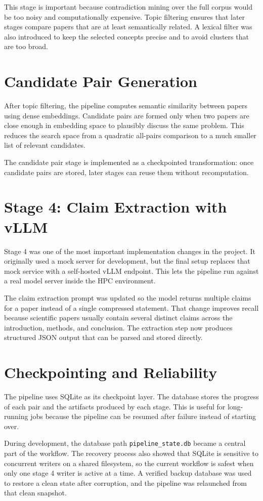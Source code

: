 \documentclass[11pt]{article}
\begin{document}
This stage is important because contradiction mining over the full corpus would be too noisy and computationally expensive. Topic filtering ensures that later stages compare papers that are at least semantically related. A lexical filter was also introduced to keep the selected concepts precise and to avoid clusters that are too broad.

\section{Candidate Pair Generation}
After topic filtering, the pipeline computes semantic similarity between papers using dense embeddings. Candidate pairs are formed only when two papers are close enough in embedding space to plausibly discuss the same problem. This reduces the search space from a quadratic all-pairs comparison to a much smaller list of relevant candidates.

The candidate pair stage is implemented as a checkpointed transformation: once candidate pairs are stored, later stages can reuse them without recomputation.

\section{Stage 4: Claim Extraction with vLLM}
Stage 4 was one of the most important implementation changes in the project. It originally used a mock server for development, but the final setup replaces that mock service with a self-hosted vLLM endpoint. This lets the pipeline run against a real model server inside the HPC environment.

The claim extraction prompt was updated so the model returns multiple claims for a paper instead of a single compressed statement. That change improves recall because scientific papers usually contain several distinct claims across the introduction, methods, and conclusion. The extraction step now produces structured JSON output that can be parsed and stored directly.

\section{Checkpointing and Reliability}
The pipeline uses SQLite as its checkpoint layer. The database stores the progress of each pair and the artifacts produced by each stage. This is useful for long-running jobs because the pipeline can be resumed after failure instead of starting over.

During development, the database path \texttt{pipeline\_state.db} became a central part of the workflow. The recovery process also showed that SQLite is sensitive to concurrent writers on a shared filesystem, so the current workflow is safest when only one stage 4 writer is active at a time. A verified backup database was used to restore a clean state after corruption, and the pipeline was relaunched from that clean snapshot.
\end{document}
